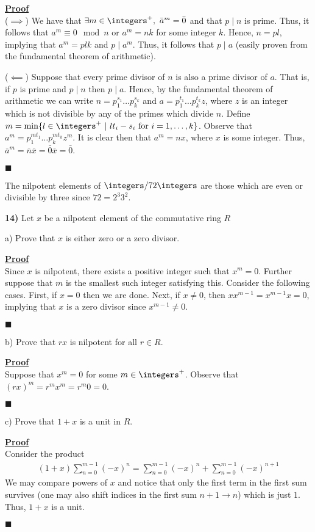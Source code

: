 \documentclass[12pt,a4paper]{article}
\newcommand{\prob}[2]{\textbf{#1)} #2}
\newenvironment{proof}
{
\textbf{\underline{Proof}} \\
}
{
\begin{flushright}
$\blacksquare$
\end{flushright}}
\begin{document}
\begin{proof}
($\implies$) We have that $\exists m \in \integers^+, ~ \bar{a}^m = \bar{0}$ and that $p \mid n$ is prime. Thus, it follows that $a^m \equiv 0 \mod{n}$ or $a^m = nk$ for some integer $k$. Hence, $n = pl$, implying that $a^m = plk$ and $p \mid a^m$. Thus, it follows that $p \mid a$ (easily proven from the fundamental theorem of arithmetic). 

($\impliedby$) Suppose that every prime divisor of $n$ is also a prime divisor of $a$. That is, if $p$ is prime and $p \mid n$ then $p \mid a$. Hence, by the fundamental theorem of arithmetic we can write $n = p_1^{s_1} \hdots p_k^{s_k}$ and $a = p_1^{t_1} \hdots p_k^{t_k}z$, where $z$ is an integer which is not divisible by any of the primes which divide $n$. Define $m = \min\{l \in \integers^+ ~ | ~ lt_i - s_i \text{ for } i = 1,\hdots,k\}$. Observe that $a^m = p_1^{mt_1} \hdots p_k^{mt_k}z^m$. It is clear then that $a^m = nx$, where $x$ is some integer. Thus, $\bar{a}^m = \bar{n}\bar{x} = \bar{0}\bar{x} = \bar{0}$.
\end{proof}

The nilpotent elements of $\integers/72\integers$ are those which are even or divisible by three since $72 = 2^3 3^2$.

\prob{14}{Let $x$ be a nilpotent element of the commutative ring $R$}

a) Prove that $x$ is either zero or a zero divisor.

\begin{proof}
Since $x$ is nilpotent, there exists a positive integer such that $x^m = 0$. Further suppose that $m$ is the smallest such integer satisfying this. Consider the following cases. First, if $x = 0$ then we are done. Next, if $x \not = 0$, then $xx^{m-1} = x^{m-1}x = 0$, implying that $x$ is a zero divisor since $x^{m-1} \not= 0$.
\end{proof}

b) Prove that $rx$ is nilpotent for all $r \in R$.

\begin{proof}
Suppose that $x^m = 0$ for some $m \in \integers^{+}$. Observe that $(rx)^m = r^mx^m = r^m0 = 0$.
\end{proof}

c) Prove that $1 + x$ is a unit in $R$.

\begin{proof}
Consider the product
\begin{align*}
(1+x)\sum_{n=0}^{m-1} (-x)^{n} = \sum_{n=0}^{m-1} (-x)^{n} + \sum_{n=0}^{m-1} (-x)^{n+1}
\end{align*}
We may compare powers of $x$ and notice that only the first term in the first sum survives (one may also shift indices in the first sum $n+1 \rightarrow n$) which is just $1$. Thus, $1+x$ is a unit.
\end{proof}
\end{document}
